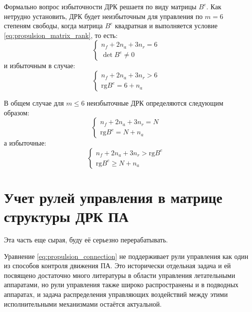 Формально вопрос избыточности ДРК решаетя по виду матрицы $B^e$.
Как нетрудно установить, ДРК будет неизбыточным для управления по $m=6$ степеням свободы, когда матрица $B^e$ квадратная и выполняется условие \ref{eq:propulsion_matrix_rank}, то есть:
\begin{equation}
    \left\{
    \begin{array}{ll}
    n_f + 2n_a + 3n_r = 6  \\
    \det B^e \neq 0 
    \end{array}
    \right.
\end{equation}
\noindent и избыточным в случае:
\begin{equation}
    \left\{
    \begin{array}{ll}
    n_f + 2n_a + 3n_r > 6  \\
    \text{rg}B^e = 6 + n_a
    \end{array}
    \right.
\end{equation}

В общем случае для $m \leq 6$ неизбыточные ДРК определяются следующим образом:
\begin{equation}
    \left\{
    \begin{array}{ll}
    n_f + 2n_a + 3n_r = N  \\
    \text{rg}B^e = N + n_a
    \end{array}
    \right.
\end{equation}
\noindent а избыточные:
\begin{equation}
    \left\{
    \begin{array}{ll}
    n_f + 2n_a + 3n_r > \text{rg}B^e  \\
    \text{rg}B^e \geq N + n_a
    \end{array}
    \right.
\end{equation}

\section{Учет рулей управления в матрице структуры ДРК ПА}
\begin{noteplan}
	Эта часть еще сырая, буду её серьезно перерабатывать.
\end{noteplan}
Уравнение \ref{eq:propulsion_connection} не поддерживает рули управления как один из способов контроля движения ПА.
Это исторически отдельная задача и ей посвящено достаточно много литературы в области управления летательными аппаратами, но рули управления также широко распространены и в подводных аппаратах, и задача распределения управляющих воздействий между этими исполнительными механизмами остаётся актуальной.


